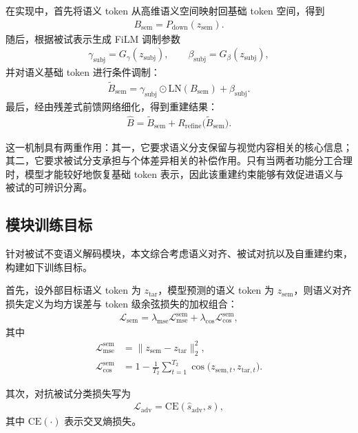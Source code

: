 在实现中，首先将语义 token 从高维语义空间映射回基础 token 空间，得到
\begin{align}
  B_{\mathrm{sem}} = P_{\mathrm{down}}(z_{\mathrm{sem}}).
\end{align}
随后，根据被试表示生成 FiLM 调制参数
\begin{align}
  \gamma_{\mathrm{subj}} = G_{\gamma}(z_{\mathrm{subj}}), \qquad
  \beta_{\mathrm{subj}} = G_{\beta}(z_{\mathrm{subj}}),
\end{align}
并对语义基础 token 进行条件调制：
\begin{align}
  \tilde{B}_{\mathrm{sem}} = \gamma_{\mathrm{subj}} \odot \mathrm{LN}(B_{\mathrm{sem}}) + \beta_{\mathrm{subj}}.
\end{align}
最后，经由残差式前馈网络细化，得到重建结果：
\begin{align}
  \hat{B} = \tilde{B}_{\mathrm{sem}} + R_{\mathrm{refine}}\bigl(\tilde{B}_{\mathrm{sem}}\bigr).
\end{align}

这一机制具有两重作用：其一，它要求语义分支保留与视觉内容相关的核心信息；其二，它要求被试分支承担与个体差异相关的补偿作用。只有当两者功能分工合理时，模型才能较好地恢复基础 token 表示，因此该重建约束能够有效促进语义与被试的可辨识分离。

\subsection{模块训练目标}

针对被试不变语义解码模块，本文综合考虑语义对齐、被试对抗以及自重建约束，构建如下训练目标。

首先，设外部目标语义 token 为 $z_{\mathrm{tar}}$，模型预测的语义 token 为 $z_{\mathrm{sem}}$，则语义对齐损失定义为均方误差与 token 级余弦损失的加权组合：
\begin{align}
  \mathcal{L}_{\mathrm{sem}} = \lambda_{\mathrm{mse}} \mathcal{L}_{\mathrm{mse}}^{\mathrm{sem}} + \lambda_{\mathrm{cos}} \mathcal{L}_{\mathrm{cos}}^{\mathrm{sem}},
\end{align}
其中
\begin{align}
  \mathcal{L}_{\mathrm{mse}}^{\mathrm{sem}} &= \lVert z_{\mathrm{sem}} - z_{\mathrm{tar}} \rVert_2^2, \\
  \mathcal{L}_{\mathrm{cos}}^{\mathrm{sem}} &= 1 - \frac{1}{T_2} \sum_{t=1}^{T_2} \cos\bigl(z_{\mathrm{sem},t}, z_{\mathrm{tar},t}\bigr).
\end{align}

其次，对抗被试分类损失写为
\begin{align}
  \mathcal{L}_{\mathrm{adv}} = \mathrm{CE}(\hat{s}_{\mathrm{adv}}, s),
\end{align}
其中 $\mathrm{CE}(\cdot)$ 表示交叉熵损失。

